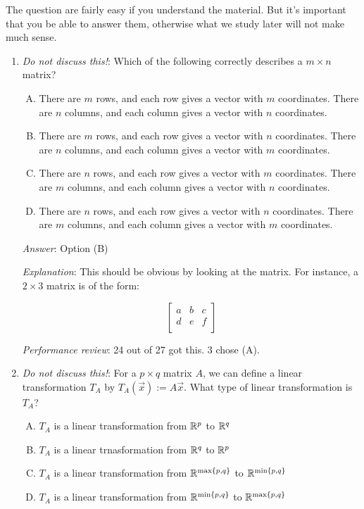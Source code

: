 \documentclass[10pt]{amsart}
\begin{document}
The question are fairly easy if you understand the material. But it's
important that you be able to answer them, otherwise what we study
later will not make much sense.

\begin{enumerate}
\item {\em Do not discuss this!}: Which of the following correctly
  describes a $m \times n$ matrix?

  \begin{enumerate}[(A)]
  \item There are $m$ rows, and each row gives a vector with $m$
    coordinates. There are $n$ columns, and each column gives a vector
    with $n$ coordinates.
  \item There are $m$ rows, and each row gives a vector with $n$
    coordinates. There are $n$ columns, and each column gives a vector
    with $m$ coordinates.
  \item There are $n$ rows, and each row gives a vector with $m$
    coordinates. There are $m$ columns, and each column gives a vector
    with $n$ coordinates.
  \item There are $n$ rows, and each row gives a vector with $n$
    coordinates. There are $m$ columns, and each column gives a vector
    with $m$ coordinates.
  \end{enumerate}

  {\em Answer}: Option (B)

  {\em Explanation}: This should be obvious by looking at the
  matrix. For instance, a $2 \times 3$ matrix is of the form:

  $$\left[\begin{matrix} a & b & c \\ d & e & f \\\end{matrix}\right]$$

  {\em Performance review}: 24 out of 27 got this. 3 chose (A).

\item {\em Do not discuss this!}: For a $p \times q$ matrix $A$, we can
  define a linear transformation $T_A$ by $T_A(\vec{x}) :=
  A\vec{x}$. What type of linear transformation is $T_A$?

  \begin{enumerate}[(A)]
  \item $T_A$ is a linear transformation from $\mathbb{R}^p$ to $\mathbb{R}^q$
  \item $T_A$ is a linear trnasformation from $\mathbb{R}^q$ to $\mathbb{R}^p$
  \item $T_A$ is a linear transformation from $\mathbb{R}^{\max\{p,q \}}$ to $\mathbb{R}^{\min\{p,q\}}$
  \item $T_A$ is a linear transformation from $\mathbb{R}^{\min\{p,q\}}$ to $\mathbb{R}^{\max\{p,q\}}$
  \end{enumerate}


\end{enumerate}
\end{document}
